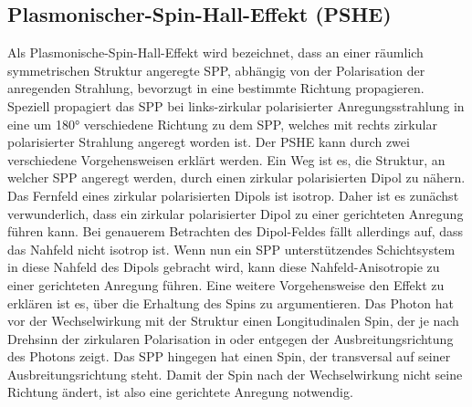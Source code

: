 \documentclass[titlepage]{article}
\begin{document}
	\subsection{Plasmonischer-Spin-Hall-Effekt (PSHE)}
	Als Plasmonische-Spin-Hall-Effekt wird bezeichnet, dass an einer räumlich symmetrischen Struktur angeregte SPP, abhängig von der Polarisation der anregenden Strahlung, bevorzugt in eine bestimmte Richtung propagieren. Speziell propagiert das SPP bei links-zirkular polarisierter Anregungsstrahlung in eine um 180° verschiedene Richtung zu dem SPP, welches mit rechts zirkular polarisierter Strahlung angeregt worden ist. Der PSHE kann durch zwei verschiedene Vorgehensweisen erklärt werden. Ein Weg ist es, die Struktur, an welcher SPP angeregt werden, durch einen zirkular polarisierten Dipol zu nähern. Das Fernfeld eines zirkular polarisierten Dipols ist isotrop. Daher ist es zunächst verwunderlich, dass ein zirkular polarisierter Dipol zu einer gerichteten Anregung führen kann. Bei genauerem Betrachten des Dipol-Feldes fällt allerdings auf, dass das Nahfeld nicht isotrop ist. Wenn nun ein SPP unterstützendes Schichtsystem in diese Nahfeld des Dipols gebracht wird, kann diese Nahfeld-Anisotropie zu einer gerichteten Anregung führen.
	Eine weitere Vorgehensweise den Effekt zu erklären ist es, über die Erhaltung des Spins zu argumentieren. Das Photon hat vor der Wechselwirkung mit der Struktur einen Longitudinalen Spin, der je nach Drehsinn der zirkularen Polarisation in oder entgegen der Ausbreitungsrichtung des Photons zeigt. Das SPP hingegen hat einen Spin, der transversal auf seiner Ausbreitungsrichtung steht. Damit der Spin nach der Wechselwirkung nicht seine Richtung ändert, ist also eine gerichtete Anregung notwendig.
\end{document}
